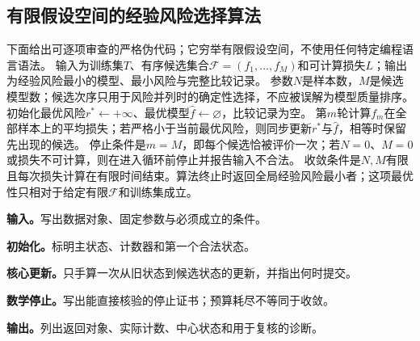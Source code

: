 \subsection*{有限假设空间的经验风险选择算法}
\label{schema:V1-C09:CH-19}
下面给出可逐项审查的严格伪代码；它穷举有限假设空间，不使用任何特定编程语言语法。
\label{schema:V1-C09:CH-20}
输入为训练集$T$、有序候选集合$\mathcal F=(f_1,\ldots,f_M)$和可计算损失$L$；输出为经验风险最小的模型、最小风险与完整比较记录。
\label{schema:V1-C09:CH-21}
参数$N$是样本数，$M$是候选模型数；候选次序只用于风险并列时的确定性选择，不应被误解为模型质量排序。
\label{schema:V1-C09:CH-22}
初始化最优风险$r^*\leftarrow+\infty$、最优模型$\widehat f\leftarrow\varnothing$，比较记录为空。
\label{schema:V1-C09:CH-23}
第$m$轮计算$f_m$在全部样本上的平均损失；若严格小于当前最优风险，则同步更新$r^*$与$\widehat f$，相等时保留先出现的候选。
\label{schema:V1-C09:CH-24}
停止条件是$m=M$，即每个候选恰被评价一次；若$N=0$、$M=0$或损失不可计算，则在进入循环前停止并报告输入不合法。
\label{schema:V1-C09:CH-25}
收敛条件是$N,M$有限且每次损失计算在有限时间结束。算法终止时返回全局经验风险最小者；这项最优性只相对于给定有限$\mathcal F$和训练集成立。


\begin{keypointbox}[title={有限假设空间的经验风险选择：五步阅读}]
\textbf{输入。}写出数据对象、固定参数与必须成立的条件。\par
\textbf{初始化。}标明主状态、计数器和第一个合法状态。\par
\textbf{核心更新。}只手算一次从旧状态到候选状态的更新，并指出何时提交。\par
\textbf{数学停止。}写出能直接核验的停止证书；预算耗尽不等同于收敛。\par
\textbf{输出。}列出返回对象、实际计数、中心状态和用于复核的诊断。
\end{keypointbox}

